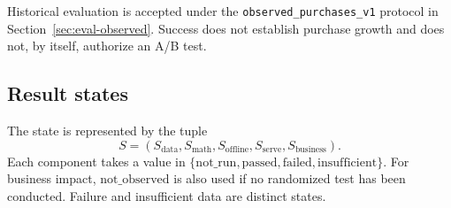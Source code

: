 \documentclass[12pt,a4paper]{article}
\newcommand{\code}[1]{{\ttfamily\small\nolinkurl{#1}}}
\theoremstyle{plainru}
\begin{document}
Historical evaluation is accepted under the \code{observed_purchases_v1} protocol
in Section~\ref{sec:eval-observed}. Success does not establish purchase growth
and does not, by itself, authorize an A/B test.

\subsection{Result states}

The state is represented by the tuple
\begin{equation}\label{eq:acceptance-state}
S=(S_{\mathrm{data}},S_{\mathrm{math}},S_{\mathrm{offline}},
S_{\mathrm{serve}},S_{\mathrm{business}}).
\end{equation}
Each component takes a value in
\(\{\mathrm{not\_run},\mathrm{passed},\mathrm{failed},
\mathrm{insufficient}\}\). For business impact,
\(\mathrm{not\_observed}\) is also used if no randomized
test has been conducted. Failure and insufficient data are distinct states.
\end{document}

